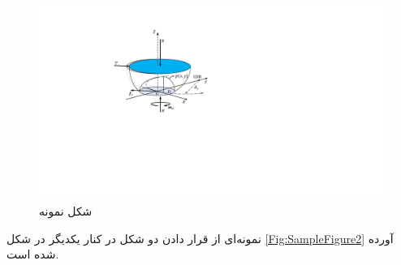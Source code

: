 \begin{figure}[!htb]
\centering
\includegraphics[scale=1]{Figures/SampleFigure.pdf}
\caption{شکل نمونه}
\label{Fig:SampleFigure1}
\end{figure}

نمونه‌ای از قرار دادن دو شکل در کنار یکدیگر در شکل
\ref{Fig:SampleFigure2}
آورده شده است.

